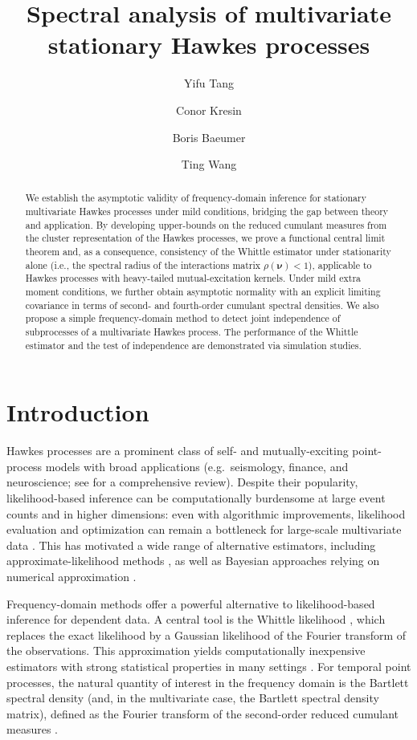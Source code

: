 \documentclass[11pt]{article}
\title{Spectral analysis of multivariate stationary Hawkes processes}
\author[1]{Yifu Tang}
\author[1]{Conor Kresin}
\author[1]{Boris Baeumer}
\author[1]{Ting Wang}
\affil[1]{Department of Mathematics and Statistics, University of Otago, New Zealand}
\numberwithin{equation}{section}
\theoremstyle{plain}
\theoremstyle{definition}
\theoremstyle{definition}
\theoremstyle{assumption}
\theoremstyle{proposition}
\theoremstyle{proposition}
\theoremstyle{example}
\theoremstyle{lemma}
\theoremstyle{theorem}
\theoremstyle{remark}
\begin{document}
\maketitle

\begin{abstract}
    We establish the asymptotic validity of frequency-domain inference for stationary multivariate Hawkes processes under mild conditions, bridging the gap between theory and application. By developing upper-bounds on the reduced cumulant measures from the cluster representation of the Hawkes processes, we prove a functional central limit theorem and, as a consequence, consistency of the Whittle estimator under stationarity alone (i.e., the spectral radius of the interactions matrix $\rho(\boldsymbol\nu)<1$), applicable to Hawkes processes with heavy-tailed mutual-excitation kernels. Under mild extra moment conditions, we further obtain asymptotic normality with an explicit limiting covariance in terms of second- and fourth-order cumulant spectral densities. We also propose a simple frequency-domain method to detect joint independence of subprocesses of a multivariate Hawkes process. The performance of the Whittle estimator and the test of independence are demonstrated via simulation studies.

\end{abstract}

\section{Introduction}
Hawkes processes \citep{Hawkes1971} are a prominent class of self- and mutually-exciting point-process models with broad applications (e.g.\ seismology, finance, and neuroscience; see \citet{reinhart2018review} for a comprehensive review). Despite their popularity, likelihood-based inference \citep{ogata1978} can be computationally burdensome at large event counts and in higher dimensions: even with algorithmic improvements, likelihood evaluation and optimization can remain a bottleneck for large-scale multivariate data \citep{kresin2023parametric}. This has motivated a wide range of alternative estimators, including approximate-likelihood methods \citep{Schoenberg2013}, as well as Bayesian approaches relying on numerical approximation \citep{rasmussen2013bayesian}. 


Frequency-domain methods offer a powerful alternative to likelihood-based inference for dependent data. A central tool is the Whittle likelihood \citep{whittle1953analysis,whittle1954stationary}, which replaces the exact likelihood by a Gaussian likelihood of the Fourier transform of the observations. This approximation yields computationally inexpensive estimators with strong statistical properties in many settings \citep{Dahlhaus1988,Brillinger2001}. For temporal point processes, the natural quantity of interest in the frequency domain is the Bartlett spectral density (and, in the multivariate case, the Bartlett spectral density matrix), defined as the Fourier transform of the second-order reduced cumulant measures \citep{Bartlett1963,Brillinger1972,Daley_and_Vere-Jones2003}.
\end{document}
